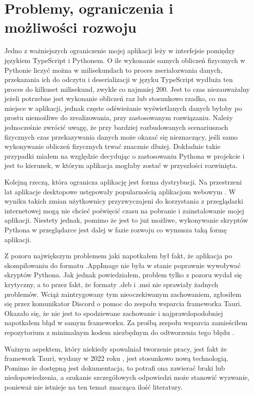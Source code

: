 \documentclass{SGGW-thesis}
\begin{document}
	\section{Problemy, ograniczenia i możliwości rozwoju}
	Jedno z ważniejszych ograniczenie mojej aplikacji leży w interfejsie pomiędzy językiem TypeScript i Pythonem. O ile wykonanie samych obliczeń fizycznych w Pythonie liczyć można w milisekundach to proces zserialozwania danych, przekazania ich do odczytu i deserializacji w języku TypeScript wydłuża ten proces do kilkuset milisekund, zwykle co najmniej 200. Jest to czas niezauważalny jeżeli potrzebne jest wykonanie obliczeń raz lub stosunkowo rzadko, co ma miejsce w aplikacji, jednak częste odświeżanie wyświetlanych danych byłoby po prostu niemożliwe do zrealizowania, przy zastosowanym rozwiązaniu. Należy jednocześnie zwrócić uwagę, że przy bardziej rozbudowanych scenariuszach fizycznych czas przekazywania danych może okazać się nieznaczący, jeśli samo wykonywanie obliczeń fizycznych trwać znacznie dłużej. Dokładnie takie przypadki miałem na względzie decydując o zastosowaniu Pythona w projekcie i jest to kierunek, w którym aplikacja mogłaby zostać w przyszłości rozwinięta.
	
	Kolejną rzeczą, która ogranicza aplikację jest forma dystrybucji. Na przestrzeni lat aplikacje desktopowe ustępowały popularnością aplikacjom webowym \cite{web-vs-desktop}. W wyniku takich zmian użytkownicy przyzwyczajeni do korzystania z przeglądarki internetowej mogą nie chcieć poświęcić czasu na pobranie i zainstalowanie mojej aplikacji. Niestety jednak, pomimo że jest to już możliwe, wykonywanie skryptów Pythona w przeglądarce jest dalej w fazie rozwoju \cite{python-webassembly} co wymusza taką formę aplikacji.
	
	Z pozoru największym problemem jaki napotkałem był fakt, że aplikacja po skompilowaniu do formatu .AppImage nie była w stanie poprawnie wywoływać skryptów Pythona. Jak jednak powiedziałem, problem tylko z pozoru wydał się krytyczny, a to przez fakt, że formaty .deb i .msi nie sprawiały żadnych problemów. Wciąż zaintrygowany tym nieoczekiwanym zachowaniem, zgłosiłem się przez komunikator Discord o pomoc do zespołu wsparcia frameworka Tauri. Okazało się, że nie jest to spodziewane zachowanie i najprawdopodobniej napotkałem błąd w samym frameworku. Za prośbą zespołu wsparcia zamieściłem repozytorium z minimalnym kodem niezbędnym do odtworzenia tego błędu \cite{app-error-repo}.
	
	Ważnym aspektem, który niekiedy spowalniał tworzenie pracy, jest fakt że framework Tauri, wydany w 2022 roku \cite{tauri-release}, jest stosunkowo nową technologią. Pomimo że dostępną jest dokumentacja, to potrafi ona zawierać braki lub niedopowiedzenia, a szukanie szczegółowych odpowiedzi może stanowić wyzwanie, ponieważ nie istnieje na ten temat znacząca ilość literatury.
	
\end{document}
